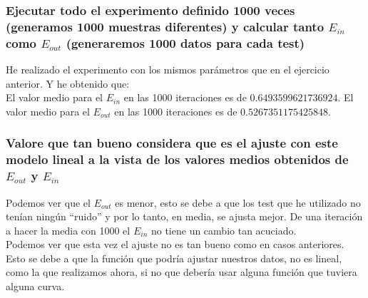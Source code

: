 \documentclass[12pt,a4paper]{article}
\begin{document}
\subsubsection{Ejecutar todo el experimento definido 1000 veces (generamos 1000	muestras diferentes) y calcular tanto $E_{in}$ como $E_{out}$ (generaremos 1000 datos para cada test)}
He realizado el experimento con los mismos parámetros que en el ejercicio anterior. Y he obtenido que:\\
El valor medio para el $E_{in}$ en las 1000 iteraciones es de $0.6493599621736924$.
El valor medio para el $E_{out}$ en las 1000 iteraciones es de $0.5267351175425848$.

\subsubsection{Valore que tan bueno considera que es el ajuste con este modelo lineal a la vista	de los valores medios obtenidos de $E_{out}$ y $E_{in}$}
Podemos ver que el $E_{out}$ es menor, esto se debe a que los test que he utilizado no tenían ningún ``ruido'' y por lo tanto, en media, se ajusta mejor. De una iteración a hacer la media con 1000 el $E_{in}$ no tiene un cambio tan acuciado.\\ Podemos ver que esta vez el ajuste no es tan bueno como en casos anteriores. Esto se debe a que la función que podría ajustar nuestros datos, no es lineal, como la que realizamos ahora, si no que debería usar alguna función que tuviera alguna curva.
\end{document}

